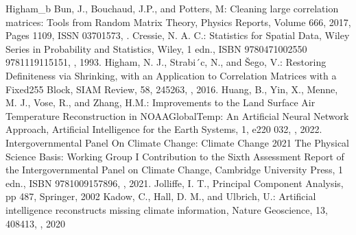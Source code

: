 \documentclass[letterpaper,10pt,english]{sphinxmanual}
\begin{document}
\begin{sphinxthebibliography}{Higham\_b}
\sphinxAtStartPar
Bun, J., Bouchaud, J.\sphinxhyphen{}P., and Potters, M: Cleaning large correlation matrices: Tools from Random Matrix Theory, Physics Reports, Volume 666, 2017, Pages 1\sphinxhyphen{}109, ISSN 0370\sphinxhyphen{}1573, .
\sphinxAtStartPar
{}
\sphinxAtStartPar
Cressie, N. A. C.: Statistics for Spatial Data, Wiley Series in Probability and Statistics, Wiley, 1 edn., ISBN 978\sphinxhyphen{}0\sphinxhyphen{}471\sphinxhyphen{}00255\sphinxhyphen{}0 978\sphinxhyphen{}1\sphinxhyphen{}119\sphinxhyphen{}11515\sphinxhyphen{}1, , 1993.
\sphinxAtStartPar
Higham, N. J., Strabi´c, N., and Šego, V.: Restoring Definiteness via Shrinking, with an Application to Correlation Matrices with a Fixed255 Block, SIAM Review, 58, 245\textendash{}263, , 2016.
\sphinxAtStartPar
{}
\sphinxAtStartPar
Huang, B., Yin, X., Menne, M. J., Vose, R., and Zhang, H.\sphinxhyphen{}M.: Improvements to the Land Surface Air Temperature Reconstruction in NOAAGlobalTemp: An Artificial Neural Network Approach, Artificial Intelligence for the Earth Systems, 1, e220 032, , 2022.
\sphinxAtStartPar
Intergovernmental Panel On Climate Change: Climate Change 2021 \textendash{} The Physical Science Basis: Working Group I Contribution to the Sixth Assessment Report of the Intergovernmental Panel on Climate Change, Cambridge University Press, 1 edn., ISBN 978\sphinxhyphen{}1\sphinxhyphen{}00\sphinxhyphen{}915789\sphinxhyphen{}6, , 2021.
\sphinxAtStartPar
Jolliffe, I. T., Principal Component Analysis, pp 487, Springer, 2002
\sphinxAtStartPar
Kadow, C., Hall, D. M., and Ulbrich, U.: Artificial intelligence reconstructs missing climate information, Nature Geoscience, 13, 408\textendash{}413, , 2020
\sphinxAtStartPar

\end{sphinxthebibliography}
\end{document}
